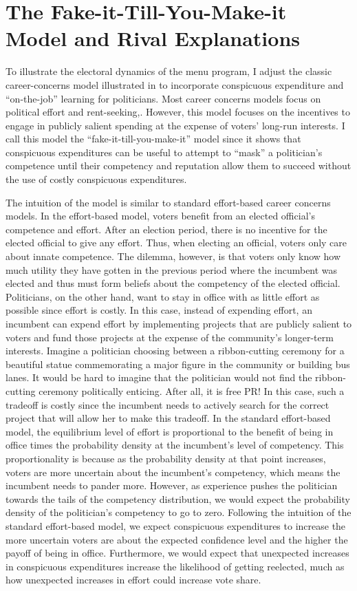 \section*{The Fake-it-Till-You-Make-it Model and Rival Explanations}
To illustrate the electoral dynamics of the menu program, I adjust the classic career-concerns model illustrated in \cite{gehlbach2021formal} to incorporate conspicuous expenditure and ``on-the-job'' learning for politicians.
Most career concerns models focus on political effort and rent-seeking,\cite{barro_politiciancontrol}\cite{ferrejohn_acct}. 
However, this model focuses on the incentives to engage in publicly salient spending at the expense of voters' long-run interests. 
I call this model the ``fake-it-till-you-make-it'' model since it shows that conspicuous expenditures can be useful to attempt to ``mask'' a politician's competence until their competency and reputation allow them to succeed without the use of costly conspicuous expenditures.

The intuition of the model is similar to standard effort-based career concerns models. 
In the effort-based model, voters benefit from an elected official's competence and effort. 
After an election period, there is no incentive for the elected official to give any effort. 
Thus, when electing an official, voters only care about innate competence. The dilemma, however, is that voters only know how much utility they have gotten in the previous period where the incumbent was elected and thus must form beliefs about the competency of the elected official. 
Politicians, on the other hand, want to stay in office with as little effort as possible since effort is costly. 
In this case, instead of expending effort, an incumbent can expend effort by implementing projects that are publicly salient to voters and fund those projects at the expense of the community's longer-term interests. 
Imagine a politician choosing between a ribbon-cutting ceremony for a beautiful statue commemorating a major figure in the community or building bus lanes. 
It would be hard to imagine that the politician would not find the ribbon-cutting ceremony politically enticing. 
After all, it is free PR! In this case, such a tradeoff is costly since the incumbent needs to actively search for the correct project that will allow her to make this tradeoff. 
In the standard effort-based model, the equilibrium level of effort is proportional to the benefit of being in office times the probability density at the incumbent's level of competency. 
This proportionality is because as the probability density at that point increases, voters are more uncertain about the incumbent's competency, which means the incumbent needs to pander more. 
However, as experience pushes the politician towards the tails of the competency distribution, we would expect the probability density of the politician's competency to go to zero. 
Following the intuition of the standard effort-based model, we expect conspicuous expenditures to increase the more uncertain voters are about the expected confidence level and the higher the payoff of being in office. 
Furthermore, we would expect that unexpected increases in conspicuous expenditures increase the likelihood of getting reelected, much as how unexpected increases in effort could increase vote share. 


